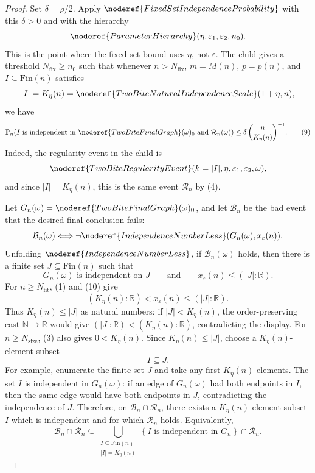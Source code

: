 \begin{proof}
Set \(\delta=\rho/2\).  Apply
\(\noderef{FixedSetIndependenceProbability}\) with this \(\delta>0\) and with
the hierarchy
\[
\noderef{ParameterHierarchy}(\eta,\varepsilon_1,\varepsilon_2,n_0).
\]
This is the point where the fixed-set bound uses \(\eta\), not
\(\varepsilon\).  The child gives a threshold \(N_{\mathrm{fix}}\ge n_0\) such
that whenever \(n>N_{\mathrm{fix}}\), \(m=M(n)\), \(p=p(n)\), and
\(I\subseteq\mathrm{Fin}(n)\) satisfies
\[
|I|=K_\eta(n)=\noderef{TwoBiteNaturalIndependenceScale}(1+\eta,n),
\]
we have
\[
\mathbb P_n\!\left(
I\text{ is independent in }\noderef{TwoBiteFinalGraph}(\omega)_0
\text{ and }\mathcal R_n(\omega)\right)
\le
\delta\,\binom{n}{K_\eta(n)}^{-1}. \tag{9}
\]
Indeed, the regularity event in the child is
\[
\noderef{TwoBiteRegularityEvent}
(k=|I|,\eta,\varepsilon_1,\varepsilon_2,\omega),
\]
and since \(|I|=K_\eta(n)\), this is the same event \(\mathcal R_n\) by (4).

Let \(G_n(\omega)=\noderef{TwoBiteFinalGraph}(\omega)_0\), and let
\(\mathcal B_n\) be the bad event that the desired final conclusion fails:
\[
\mathcal B_n(\omega)\Longleftrightarrow
\neg\noderef{IndependenceNumberLess}(G_n(\omega),x_\varepsilon(n)).
\]
Unfolding \(\noderef{IndependenceNumberLess}\), if \(\mathcal B_n(\omega)\)
holds, then there is a finite set \(J\subseteq\mathrm{Fin}(n)\) such that
\[
G_n(\omega)\text{ is independent on }J
\qquad\text{and}\qquad
x_\varepsilon(n)\le (|J|:\mathbb R). \tag{10}
\]
For \(n\ge N_{\mathrm{fit}}\), (1) and (10) give
\[
(K_\eta(n):\mathbb R)<x_\varepsilon(n)\le(|J|:\mathbb R).
\]
Thus \(K_\eta(n)\le |J|\) as natural numbers: if \(|J|<K_\eta(n)\), the
order-preserving cast \(\mathbb N\to\mathbb R\) would give
\((|J|:\mathbb R)<(K_\eta(n):\mathbb R)\), contradicting the display.
For \(n\ge N_{\mathrm{size}}\), (3) also gives \(0<K_\eta(n)\).  Since
\(K_\eta(n)\le |J|\), choose a \(K_\eta(n)\)-element subset
\[
I\subseteq J.
\]
For example, enumerate the finite set \(J\) and take any first
\(K_\eta(n)\) elements.  The set \(I\) is independent in \(G_n(\omega)\):
if an edge of \(G_n(\omega)\) had both endpoints in \(I\), then the same edge
would have both endpoints in \(J\), contradicting the independence of \(J\).
Therefore, on \(\mathcal B_n\cap\mathcal R_n\), there exists a
\(K_\eta(n)\)-element subset \(I\) which is independent and for which
\(\mathcal R_n\) holds.  Equivalently,
\[
\mathcal B_n\cap\mathcal R_n
\subseteq
\bigcup_{\substack{I\subseteq \mathrm{Fin}(n)\\ |I|=K_\eta(n)}}
\left\{
I\text{ is independent in }G_n
\right\}\cap\mathcal R_n. \tag{11}
\]


\end{proof}
